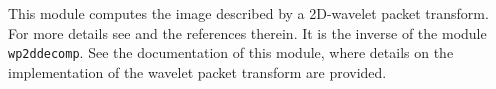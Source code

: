 This module computes the image described by a 2D-wavelet packet
transform. For more details see \cite{mallat:wavelet} and the references
therein.  It is the inverse of the module \verb+wp2ddecomp+. See the
documentation of this module, where details on the
implementation of the wavelet packet transform are provided.


